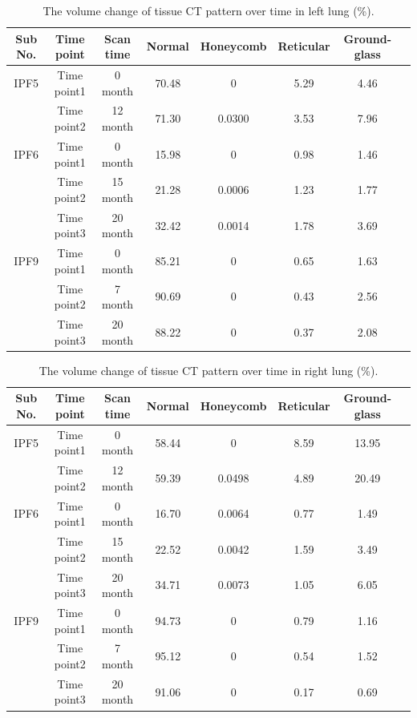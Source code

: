 \begin{table}[htbp]
\centering
\caption{The volume change of tissue CT pattern over time in left lung (\%).}
\label{tab:TissueVolumeLeft}
\begin{tabular}{c c c c c c c c}
\hline
\bf{Sub No.} & \bf{Time point} & \bf{Scan time}	& \bf{Normal} &	\bf{Honeycomb} & \bf{Reticular} & \bf{Ground-glass}\\ 
\hline
IPF5 & Time point1 &  0 month & 70.48 & 0 & 5.29 & 4.46\\
\quad & Time point2 & 12 month & 71.30 & 0.0300 & 3.53 & 7.96\\
\hline
IPF6 & Time point1 &	0 month &	15.98 &	0 & 0.98 & 1.46\\
\quad & Time point2 &	15 month &	21.28 &	0.0006 & 1.23 & 1.77\\
\quad & Time point3 &	20 month &	32.42 &	0.0014 & 1.78 & 3.69\\
\hline
IPF9 & Time point1 &	0 month &	85.21 &	0 & 0.65 & 1.63\\
\quad & Time point2 &	7 month &	90.69 &	0 & 0.43 & 2.56\\
\quad & Time point3 &	20 month &	88.22 &	0 & 0.37 & 2.08\\
\hline
\end{tabular}
\end{table}

\begin{table}[htbp]
\centering
\caption{The volume change of tissue CT pattern over time in right lung (\%).}
\label{tab:TissueVolumeRight}
\begin{tabular}{c c c c c c c c}
\hline
\bf{Sub No.} & \bf{Time point} & \bf{Scan time}	& \bf{Normal} &	\bf{Honeycomb} & \bf{Reticular} & \bf{Ground-glass}\\ 
\hline
IPF5 & Time point1 &  0 month & 58.44 & 0 & 8.59 & 13.95\\
\quad & Time point2 & 12 month & 59.39 & 0.0498 & 4.89 & 20.49\\
\hline
IPF6 & Time point1 &	0 month &	16.70 &	0.0064 & 0.77 & 1.49\\
\quad & Time point2 &	15 month &	22.52 &	0.0042 & 1.59 & 3.49\\
\quad & Time point3 &	20 month &	34.71 &	0.0073 & 1.05 & 6.05\\
\hline
IPF9 & Time point1 &	0 month &	94.73 &	0 & 0.79 & 1.16\\
\quad & Time point2 &	7 month &	95.12 &	0 & 0.54 & 1.52\\
\quad & Time point3 &	20 month &	91.06 &	0 & 0.17 & 0.69\\
\hline
\end{tabular}
\end{table}

